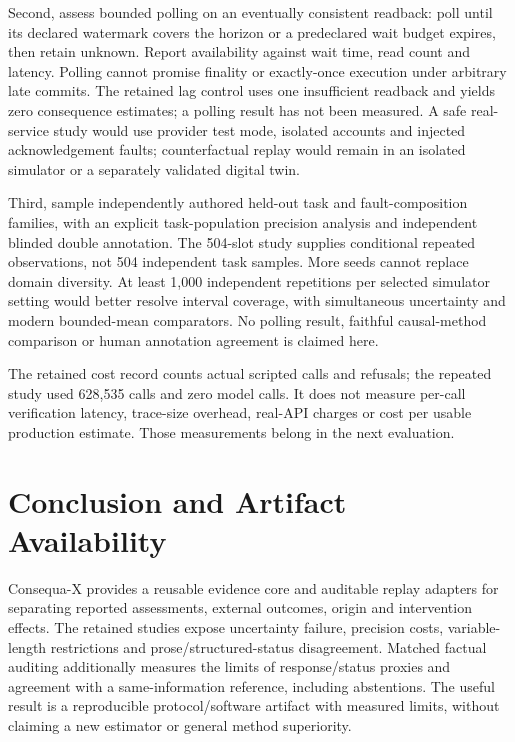 \documentclass[conference]{IEEEtran}
\begin{document}
Second, assess bounded polling on an eventually consistent readback: poll
until its declared watermark covers the horizon or a predeclared wait budget
expires, then retain unknown. Report availability against wait time, read
count and latency. Polling cannot promise finality or exactly-once execution
under arbitrary late commits. The retained lag control uses one insufficient
readback and yields zero consequence estimates; a polling result has not been
measured. A safe real-service study would use provider test mode, isolated
accounts and injected acknowledgement faults; counterfactual replay would
remain in an isolated simulator or a separately validated digital twin.

Third, sample independently authored held-out task and fault-composition
families, with an explicit task-population precision analysis and independent
blinded double annotation. The 504-slot study supplies conditional repeated
observations, not 504 independent task samples. More seeds cannot replace
domain diversity. At least 1,000 independent repetitions per selected
simulator setting would better resolve interval coverage, with simultaneous
uncertainty and modern bounded-mean comparators. No polling result, faithful
causal-method comparison or human annotation agreement is claimed here.

The retained cost record counts actual scripted calls and refusals; the repeated
study used 628,535 calls and zero model calls. It does not measure per-call
verification latency, trace-size overhead, real-API charges or cost per usable
production estimate. Those measurements belong in the next evaluation.

\section{Conclusion and Artifact Availability}
Consequa-X provides a reusable evidence core and auditable replay adapters for
separating reported assessments, external outcomes, origin and intervention
effects. The retained studies expose uncertainty failure, precision costs,
variable-length restrictions and prose/structured-status disagreement. Matched
factual auditing additionally measures the limits of response/status proxies
and agreement with a same-information reference, including abstentions.
The useful result is a reproducible protocol/software artifact with measured
limits, without claiming a new estimator or general method superiority.
\end{document}
